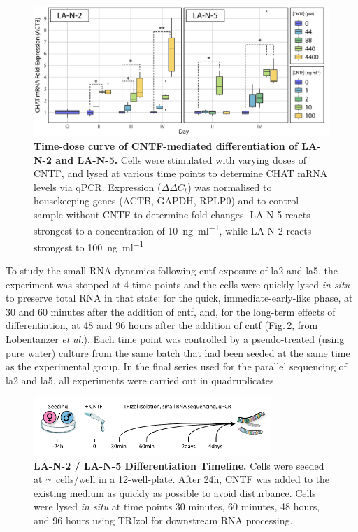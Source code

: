 \begin{figure}
\includegraphics[width=\textwidth]{figures/time-dose}
\caption[Time-dose curve, LA-N-2 and LA-N-5.]{\textbf{Time-dose curve of CNTF-mediated differentiation of LA-N-2 and LA-N-5.} Cells were stimulated with varying doses of CNTF, and lysed at various time points to determine CHAT mRNA levels via qPCR. Expression ($\Delta\Delta{C}_t$) was normalised to housekeeping genes (ACTB, GAPDH, RPLP0) and to control sample without CNTF to determine fold-changes. LA-N-5 reacts strongest to a concentration of \SI{10}{\nano\gram\per\milli\litre}, while LA-N-2 reacts strongest to \SI{100}{\nano\gram\per\milli\litre}.
\label{fig:time-dose}}
\end{figure}

\begin{method}

To study the small RNA dynamics following \ac{cntf} exposure of \ac{la2} and \ac{la5}, the experiment was stopped at 4 time points and the cells were quickly lysed \textit{in situ} to preserve total RNA in that state: for the quick, immediate-early-like phase, at 30 and 60 minutes after the addition of \ac{cntf}, and, for the long-term effects of differentiation, at 48 and 96 hours after the addition of \ac{cntf} (Fig.\,\ref{fig:timepoints}, from Lobentanzer \textit{et al.}\cite{Lobentanzer2019a}). Each time point was controlled by a pseudo-treated (using pure water) culture from the same batch that had been seeded at the same time as the experimental group. In the final series used for the parallel sequencing of \ac{la2} and \ac{la5}, all experiments were carried out in quadruplicates. 

\end{method}

\begin{figure}
\centering
\includegraphics[width=0.8\textwidth]{figures/timepoints}
\caption[LA-N-2 / LA-N-5 Differentiation Timeline.]{\textbf{LA-N-2 / LA-N-5 Differentiation Timeline.} Cells were seeded at $\smallsim$ cells/well in a 12-well-plate. After 24h, CNTF was added to the existing medium as quickly as possible to avoid disturbance. Cells were lysed \textit{in situ} at time points 30 minutes, 60 minutes, 48 hours, and 96 hours using TRIzol for downstream RNA processing.
\label{fig:timepoints}}
\end{figure}

